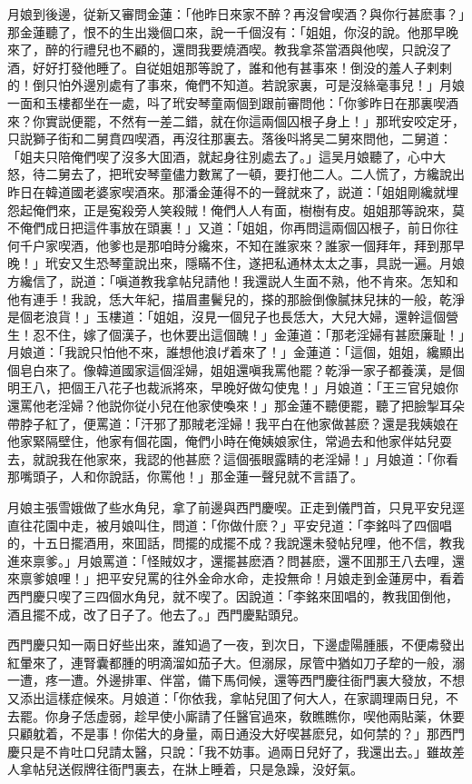 月娘到後邊，従新又審問金蓮：「他昨日來家不醉？再沒曾喫酒？與你行甚麽事？」那金蓮聽了，恨不的生出幾個口來，說一千個沒有：「姐姐，你沒的說。他那早晚來了，醉的行禮兒也不顧的，還問我要燒酒喫。教我拿茶當酒與他喫，只說沒了酒，好好打發他睡了。自従姐姐那等說了，誰和他有甚事來！倒没的羞人子剌剌的！倒只怕外邊別處有了事來，俺們不知道。若說家裏，可是沒絲毫事兒！」月娘一面和玉樓都坐在一處，呌了玳安琴童兩個到跟前審問他：「你爹昨日在那裏喫酒來？你實説便罷，不然有一差二錯，就在你這兩個囚根子身上！」那玳安咬定牙，只説獅子街和二舅賁四喫酒，再沒往那裏去。落後呌將吴二舅來問他，二舅道：「姐夫只陪俺們喫了沒多大囬酒，就起身往別處去了。」這吴月娘聽了，心中大怒，待二舅去了，把玳安琴童儘力數駡了一頓，要打他二人。二人慌了，方纔說出昨日在韓道國老婆家喫酒來。那潘金蓮得不的一聲就來了，説道：「姐姐剛纔就埋怨起俺們來，正是寃殺旁人笑殺賊！俺們人人有面，樹樹有皮。姐姐那等說來，莫不俺們成日把這件事放在頭裏！」又道：「姐姐，你再問這兩個囚根子，前日你往何千户家喫酒，他爹也是那咱時分纔來，不知在誰家來？誰家一個拜年，拜到那早晚！」玳安又生恐琴童說出來，隱瞞不住，遂把私通林太太之事，具説一遍。月娘方纔信了，説道：「嗔道教我拿帖兒請他！我還説人生面不熟，他不肯來。怎知和他有連手！我說，恁大年紀，描眉畫鬢兒的，搽的那臉倒像膩抹兒抹的一般，乾淨是個老浪貨！」玉樓道：「姐姐，沒見一個兒子也長恁大，大兒大婦，還幹這個營生！忍不住，嫁了個漢子，也休要出這個醜！」金蓮道：「那老淫婦有甚麽廉耻！」月娘道：「我說只怕他不來，誰想他浪げ着來了！」金蓮道：「這個，姐姐，纔顯出個皂白來了。像韓道國家這個淫婦，姐姐還嗔我罵他罷？乾淨一家子都養漢，是個明王八，把個王八花子也裁派將來，早晚好做勾使鬼！」月娘道：「王三官兒娘你還罵他老淫婦？他説你従小兒在他家使喚來！」那金蓮不聽便罷，聽了把臉掣耳朵帶脖子紅了，便罵道：「汗邪了那賊老淫婦！我平白在他家做甚麽？還是我姨娘在他家緊隔壁住，他家有個花園，俺們小時在俺姨娘家住，常過去和他家伴姑兒耍去，就說我在他家來，我認的他甚麽？這個張眼露睛的老淫婦！」月娘道：「你看那嘴頭子，人和你說話，你罵他！」那金蓮一聲兒就不言語了。

月娘主張雪娥做了些水角兒，拿了前邊與西門慶喫。正走到儀門首，只見平安兒逕直往花園中走，被月娘叫住，問道：「你做什麽？」平安兒道：「李銘呌了四個唱的，十五日擺酒用，來囬話，問擺的成擺不成？我說還未發帖兒哩，他不信，教我進來禀爹。」月娘罵道：「怪賊奴才，還擺甚麽酒？問甚麽，還不囬那王八去哩，還來禀爹娘哩！」把平安兒罵的往外金命水命，走投無命！月娘走到金蓮房中，看着西門慶只喫了三四個水角兒，就不喫了。因說道：「李銘來囬唱的，教我囬倒他，酒且擺不成，改了日子了。他去了。」西門慶點頭兒。

西門慶只知一兩日好些出來，誰知過了一夜，到次日，下邊虚陽腫脹，不便䖏發出紅暈來了，連腎囊都腫的明滴溜如茄子大。但溺尿，尿管中猶如刀子犂的一般，溺一遭，疼一遭。外邊排軍、伴當，備下馬伺候，還等西門慶往衙門裏大發放，不想又添出這樣症候來。月娘道：「你依我，拿帖兒囬了何大人，在家調理兩日兒，不去罷。你身子恁虚弱，趁早使小廝請了任醫官過來，敎瞧瞧你，喫他兩貼薬，休要只顧躭着，不是事！你偌大的身量，兩日通没大好喫甚麽兒，如何禁的？」那西門慶只是不肯吐口兒請太醫，只說：「我不妨事。過兩日兒好了，我還出去。」雖故差人拿帖兒送假牌往衙門裏去，在牀上睡着，只是急躁，没好氣。

